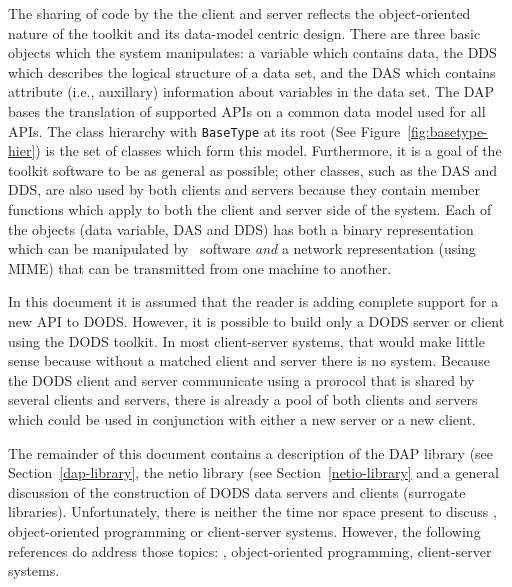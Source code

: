 The sharing of code by the the client and server reflects the object-oriented
nature of the toolkit and its data-model centric design. There are three
basic objects which the system manipulates: a variable which contains data,
the DDS which describes the logical structure of a data set, and the DAS
which contains attribute (i.e., auxillary) information about variables in the
data set.  The DAP bases the translation of supported APIs on a common data
model used for all APIs. The class hierarchy with {\tt BaseType} at its root
(See Figure~\ref{fig:basetype-hier}) is the set of classes which form this
model.  Furthermore, it is a goal of the toolkit software to be as general as
possible; other classes, such as the DAS and DDS, are also used by both
clients and servers because they contain member functions which apply to both
the client and server side of the system. Each of the objects (data variable,
DAS and DDS) has both a binary representation which can be manipulated by
\Cpp\ software {\em and\/} a network representation (using MIME) that can be
transmitted from one machine to another.

In this document it is assumed that the reader is adding complete support for
a new API to DODS. However, it is possible to build only a DODS server or
client using the DODS toolkit. In most client-server systems, that would make
little sense because without a matched client and server there is no
system. Because the DODS client and server communicate using a prorocol that
is shared by several clients and servers, there is already a pool of both
clients and servers which could be used in conjunction with either a new
server or a new client.

The remainder of this document contains a description of the DAP library (see
Section~\ref{dap-library}, the netio library (see Section~\ref{netio-library}
and a general discussion of the construction of DODS data servers and clients
(surrogate libraries). Unfortunately, there is neither the time nor space
present to discuss \Cpp, object-oriented programming or client-server
systems. However, the following references do address those topics:
\Cpp\cite{stroustrup:cpp}\cite{meyers:cpp}\cite{cargill:cpp}, object-oriented
programming\cite{meyer:oop}, client-server systems\cite{steven:unp}.

